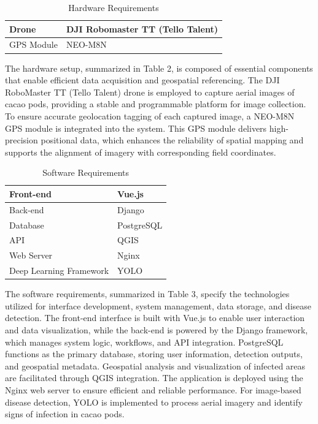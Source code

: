 \begin{table}[H]
	\centering
	\caption{Hardware Requirements}
	\label{tab:hardreq}
	\begin{tabular}{ll}
		\toprule
		Drone      & DJI Robomaster TT (Tello Talent) \\
		\midrule
		GPS Module & NEO-M8N                          \\
		\bottomrule
	\end{tabular}
\end{table}

The hardware setup, summarized in Table 2, is composed of essential components that enable efficient data acquisition and geospatial referencing. The DJI RoboMaster TT (Tello Talent) drone is employed to capture aerial images of cacao pods, providing a stable and programmable platform for image collection. To ensure accurate geolocation tagging of each captured image, a NEO-M8N GPS module is integrated into the system. This GPS module delivers high-precision positional data, which enhances the reliability of spatial mapping and supports the alignment of imagery with corresponding field coordinates.

\begin{table}[H]
	\centering
	\caption{Software Requirements}
	\label{tab:softreq}
	\begin{tabular}{ll}
		\toprule
		Front-end               & Vue.js     \\
		\midrule
		Back-end                & Django     \\
		\midrule
		Database                & PostgreSQL \\
		\midrule
		API                     & QGIS       \\
		\midrule
		Web Server              & Nginx      \\
		\midrule
		Deep Learning Framework & YOLO       \\
		\bottomrule
	\end{tabular}
\end{table}

The software requirements, summarized in Table 3, specify the technologies utilized for interface development, system management, data storage, and disease detection. The front-end interface is built with Vue.js to enable user interaction and data visualization, while the back-end is powered by the Django framework, which manages system logic, workflows, and API integration. PostgreSQL functions as the primary database, storing user information, detection outputs, and geospatial metadata. Geospatial analysis and visualization of infected areas are facilitated through QGIS integration. The application is deployed using the Nginx web server to ensure efficient and reliable performance. For image-based disease detection, YOLO is implemented to process aerial imagery and identify signs of infection in cacao pods.

